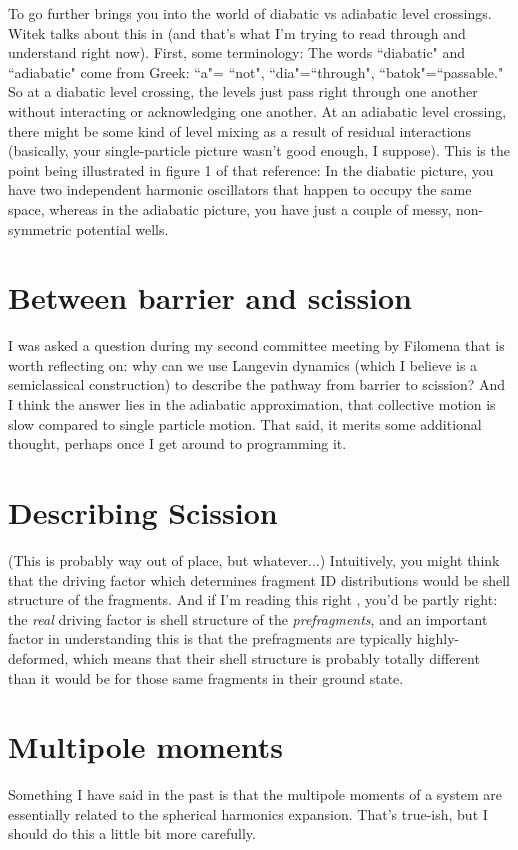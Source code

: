 To go further brings you into the world of diabatic vs adiabatic level crossings. Witek talks about this in \cite{Nazarewicz1993} (and that's what I'm trying to read through and understand right now). First, some terminology: The words ``diabatic" and ``adiabatic" come from Greek: ``a"= ``not", ``dia"=``through", ``batok"=``passable." So at a diabatic level crossing, the levels just pass right through one another without interacting or acknowledging one another. At an adiabatic level crossing, there might be some kind of level mixing as a result of residual interactions (basically, your single-particle picture wasn't good enough, I suppose). This is the point being illustrated in figure 1 of that reference: In the diabatic picture, you have two independent harmonic oscillators that happen to occupy the same space, whereas in the adiabatic picture, you have just a couple of messy, non-symmetric potential wells.

\section{Between barrier and scission}

I was asked a question during my second committee meeting by Filomena that is worth reflecting on: why can we use Langevin dynamics (which I believe is a semiclassical construction) to describe the pathway from barrier to scission? And I think the answer lies in the adiabatic approximation, that collective motion is slow compared to single particle motion. That said, it merits some additional thought, perhaps once I get around to programming it.

\section{Describing Scission}

(This is probably way out of place, but whatever...) Intuitively, you might think that the driving factor which determines fragment ID distributions would be shell structure of the fragments. And if I'm reading this right \cite[2nd paragraph + references]{Mcdonnell2014}, you'd be partly right: the \textit{real} driving factor is shell structure of the \textit{prefragments}, and an important factor in understanding this is that the prefragments are typically highly-deformed, which means that their shell structure is probably totally different than it would be for those same fragments in their ground state.

\section{Multipole moments}
Something I have said in the past is that the multipole moments of a system are essentially related to the spherical harmonics expansion. That's true-ish, but I should do this a little bit more carefully.

